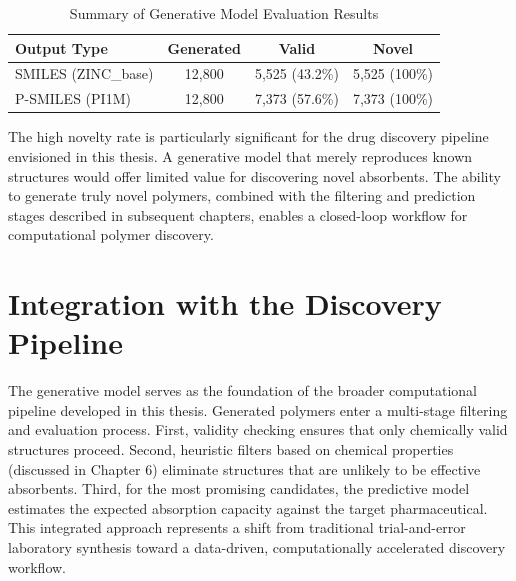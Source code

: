 \begin{table}[htbp]
	\centering
	\caption{Summary of Generative Model Evaluation Results}
	\label{tab:generation_results}
	\begin{tabular}{lccc}
		\toprule
		\textbf{Output Type} & \textbf{Generated} & \textbf{Valid} & \textbf{Novel} \\
		\midrule
		SMILES (ZINC\_base)  & 12,800             & 5,525 (43.2\%) & 5,525 (100\%)  \\
		P-SMILES (PI1M)      & 12,800             & 7,373 (57.6\%) & 7,373 (100\%)  \\
		\bottomrule
	\end{tabular}
\end{table}

The high novelty rate is particularly significant for the drug discovery pipeline envisioned in this thesis. A generative model that merely reproduces known structures would offer limited value for discovering novel absorbents. The ability to generate truly novel polymers, combined with the filtering and prediction stages described in subsequent chapters, enables a closed-loop workflow for computational polymer discovery.

\section{Integration with the Discovery Pipeline}
\label{sec:pipeline_integration}

The generative model serves as the foundation of the broader computational pipeline developed in this thesis. Generated polymers enter a multi-stage filtering and evaluation process. First, validity checking ensures that only chemically valid structures proceed. Second, heuristic filters based on chemical properties (discussed in Chapter 6) eliminate structures that are unlikely to be effective absorbents. Third, for the most promising candidates, the predictive model estimates the expected absorption capacity against the target pharmaceutical. This integrated approach represents a shift from traditional trial-and-error laboratory synthesis toward a data-driven, computationally accelerated discovery workflow.
